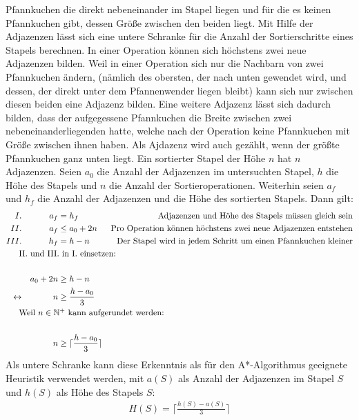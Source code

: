 \documentclass[a4paper,10pt,ngerman]{scrartcl}
\begin{document}
Pfannkuchen die direkt nebeneinander im Stapel liegen und für die es keinen Pfannkuchen gibt, dessen Größe zwischen den beiden liegt.
Mit Hilfe der Adjazenzen lässt sich eine untere Schranke für die Anzahl der Sortierschritte eines Stapels berechnen.
In einer Operation können sich höchstens zwei neue Adjazenzen bilden. Weil in einer Operation sich nur die Nachbarn von zwei
Pfannkuchen ändern, (nämlich des obersten, der nach unten gewendet wird, und dessen, der direkt unter dem Pfannenwender liegen bleibt)
kann sich nur zwischen diesen beiden eine Adjazenz bilden. Eine weitere Adjazenz lässt sich dadurch bilden, dass der aufgegessene
Pfannkuchen die Breite zwischen zwei nebeneinanderliegenden hatte, welche nach der Operation keine Pfannkuchen mit Größe zwischen ihnen haben.
Als Ajdazenz wird auch gezählt, wenn der größte Pfannkuchen ganz unten liegt. Ein sortierter Stapel der Höhe $n$ hat $n$ Adjazenzen.
Seien $a_0$ die Anzahl der Adjazenzen im untersuchten Stapel, $h$ die Höhe des Stapels und $n$ die Anzahl der Sortieroperationen. Weiterhin seien
$a_f$ und $h_f$ die Anzahl der Adjazenzen und die Höhe des sortierten Stapels. Dann gilt:
\begin{align*}
  I.              &  & a_f      & = h_f                              & \text{Adjazenzen und Höhe des Stapels müssen gleich sein}            \\
  II.             &  & a_f      & \leq a_0 + 2n                      & \text{Pro Operation können höchstens zwei neue Adjazenzen entstehen} \\
  III.            &  & h_f      & = h - n                            & \text{Der Stapel wird in jedem Schritt um einen Pfannkuchen kleiner} \\
  \noalign{II. und III. in I. einsetzen:}                                                                                                   \\
                  &  & a_0 + 2n & \geq h - n                         &                                                                      \\
  \leftrightarrow &  & n        & \geq \frac{h - a_0}{3}                                                                                    \\
  \noalign{Weil $n \in \mathbb{N}^+$ kann aufgerundet werden:}                                                                              \\
                  &  & n        & \geq \lceil\frac{h - a_0}{3}\rceil                                                                        \\
\end{align*}
Als untere Schranke kann diese Erkenntnis als für den A*-Algorithmus geeignete Heuristik verwendet werden,
mit $a(S)$ als Anzahl der Adjazenzen im Stapel $S$ und $h(S)$ als Höhe des Stapels $S$:
\begin{align*}
  H(S) = \lceil\frac{h(S) - a(S)}{3}\rceil
\end{align*}
\end{document}
